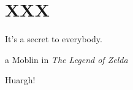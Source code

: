 \documentclass[\main/main.tex]{subfiles}
\begin{document}
\chapter{XXX\label{chap:XXX}}
\epigraph{It's a secret to everybody.}{a Moblin in \textit{The Legend of Zelda}}

Huargh! \cite{altland_simons_2010}
\end{document}
